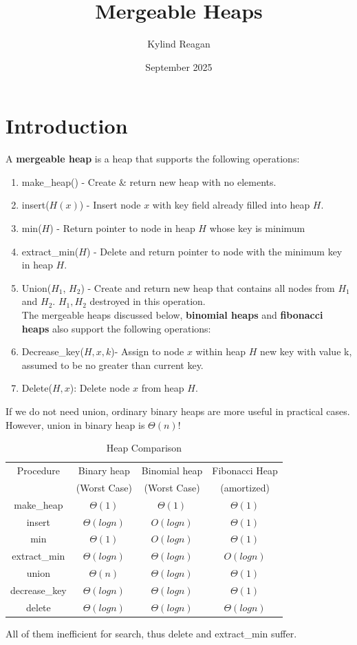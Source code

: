 \documentclass{article}
\title{Mergeable Heaps}
\author{Kylind Reagan}
\date{September 2025}
\begin{document}
\maketitle

\section{Introduction}
A \textbf{mergeable heap} is a heap that supports the following operations:
\begin{enumerate}
    \item make\_heap() - Create \& return new heap with no elements.
    \item insert($H(x)$) - Insert node $x$ with key field already filled into heap $H$.
    \item  min($H$) - Return pointer to node in heap $H$ whose key is minimum
    \item extract\_min($H$) - Delete and return pointer to node with the minimum key in heap $H$.
    \item Union($H_1$, $H_2$) - Create and return new heap that contains all nodes from $H_1$ and $H_2$. $H_1, H_2$ destroyed in this operation.\\

    The mergeable heaps discussed below, \textbf{binomial heaps} and \textbf{fibonacci heaps} also support the following operations:\\
    \item Decrease\_key($H,x,k$)- Assign to node $x$ within heap $H$ new key with value k, assumed to be no greater than current key.
    \item Delete($H,x$): Delete node $x$ from heap $H$.
\end{enumerate}
If we do not need union, ordinary binary heaps are more useful in practical cases. However, union in binary heap is $\Theta(n)$!

\begin{table}[H]
    \centering
    \begin{tabular}{c|c|c|c}
    Procedure & Binary heap & Binomial heap & Fibonacci Heap \\
    & (Worst Case) & (Worst Case) & (amortized)\\
    \hline
    make\_heap & $\Theta(1)$ & $\Theta(1)$ & $\Theta(1)$\\
    insert & $\Theta(logn)$ & $O(logn)$ & $\Theta(1)$\\
    min & $\Theta(1)$ & $O(logn)$ & $\Theta(1)$\\
    extract\_min & $\Theta(logn)$ & $\Theta(logn)$ & $O(logn)$ \\
    union & $\Theta(n)$ & $\Theta(logn)$ & $\Theta(1)$\\
    decrease\_key & $\Theta(logn)$ & $\Theta(logn)$ & $\Theta(1)$\\
    delete & $\Theta(logn)$ & $\Theta(logn)$ & $\Theta(logn)$
    \end{tabular}
    \caption{Heap Comparison}
    \label{tab:placeholder}
\end{table}
\noindent All of them inefficient for search, thus delete and extract\_min suffer.
\end{document}
